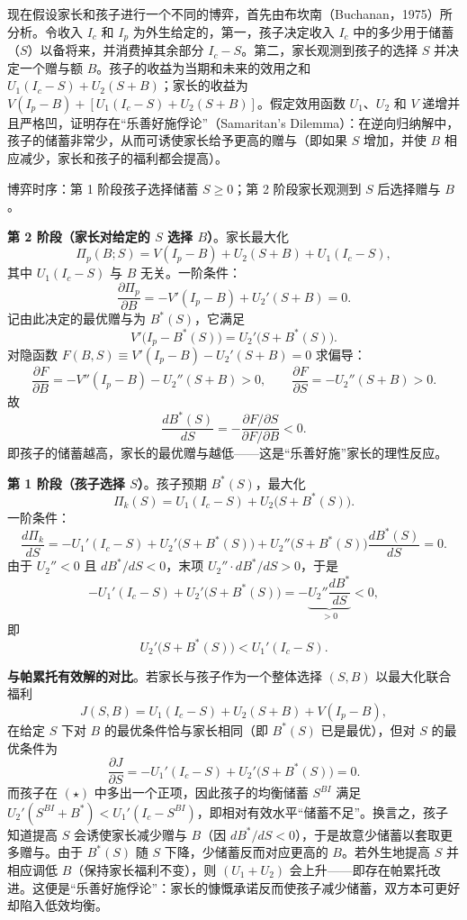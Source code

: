 现在假设家长和孩子进行一个不同的博弈，首先由布坎南（Buchanan，1975）所分析。令收入 $I_c$ 和 $I_p$ 为外生给定的，第一，孩子决定收入 $I_c$ 中的多少用于储蓄（$S$）以备将来，并消费掉其余部分 $I_c-S$。第二，家长观测到孩子的选择 $S$ 并决定一个赠与额 $B$。孩子的收益为当期和未来的效用之和 $U_1(I_c-S)+U_2(S+B)$；家长的收益为 $V(I_p-B)+[U_1(I_c-S)+U_2(S+B)]$。假定效用函数 $U_1$、$U_2$ 和 $V$ 递增并且严格凹，证明存在“乐善好施俘论”（Samaritan's Dilemma）：在逆向归纳解中，孩子的储蓄非常少，从而可诱使家长给予更高的赠与（即如果 $S$ 增加，并使 $B$ 相应减少，家长和孩子的福利都会提高）。

\sol
博弈时序：第 1 阶段孩子选择储蓄 $S\ge 0$；第 2 阶段家长观测到 $S$ 后选择赠与 $B$。

\textbf{第 2 阶段（家长对给定的 $S$ 选择 $B$）}。家长最大化
\[
\Pi_p(B;S)=V(I_p-B)+U_2(S+B)+U_1(I_c-S),
\]\indent
其中 $U_1(I_c-S)$ 与 $B$ 无关。一阶条件：
\[
\frac{\partial\Pi_p}{\partial B}=-V'(I_p-B)+U_2'(S+B)=0.
\]\indent
记由此决定的最优赠与为 $B^*(S)$，它满足
\[
V'\!\bigl(I_p-B^*(S)\bigr)=U_2'\!\bigl(S+B^*(S)\bigr).
\]\indent
对隐函数 $F(B,S)\equiv V'(I_p-B)-U_2'(S+B)=0$ 求偏导：
\[
\frac{\partial F}{\partial B}=-V''(I_p-B)-U_2''(S+B)>0,\qquad
\frac{\partial F}{\partial S}=-U_2''(S+B)>0.
\]\indent
故
\[
\frac{dB^*(S)}{dS}=-\frac{\partial F/\partial S}{\partial F/\partial B}<0.
\]\indent
即孩子的储蓄越高，家长的最优赠与越低——这是“乐善好施”家长的理性反应。

\textbf{第 1 阶段（孩子选择 $S$）}。孩子预期 $B^*(S)$，最大化
\[
\Pi_k(S)=U_1(I_c-S)+U_2\!\bigl(S+B^*(S)\bigr).
\]\indent
一阶条件：
\[
\frac{d\Pi_k}{dS}=-U_1'(I_c-S)+U_2'\!\bigl(S+B^*(S)\bigr)
+U_2''\!\bigl(S+B^*(S)\bigr)\frac{dB^*(S)}{dS}=0.
\]\indent
由于 $U_2''<0$ 且 $dB^*/dS<0$，末项 $U_2''\cdot dB^*/dS>0$，于是
\[
-U_1'(I_c-S)+U_2'\!\bigl(S+B^*(S)\bigr)=-\underbrace{U_2''\frac{dB^*}{dS}}_{>0}<0,
\]\indent
即
\[
U_2'\!\bigl(S+B^*(S)\bigr)<U_1'(I_c-S).\tag{$\star$}
\]

\textbf{与帕累托有效解的对比}。若家长与孩子作为一个整体选择 $(S,B)$ 以最大化联合福利
\[
J(S,B)=U_1(I_c-S)+U_2(S+B)+V(I_p-B),
\]\indent
在给定 $S$ 下对 $B$ 的最优条件恰与家长相同（即 $B^*(S)$ 已是最优），但对 $S$ 的最优条件为
\[
\frac{\partial J}{\partial S}=-U_1'(I_c-S)+U_2'\!\bigl(S+B^*(S)\bigr)=0.
\]\indent
而孩子在 $(\star)$ 中多出一个正项，因此孩子的均衡储蓄 $S^{BI}$ 满足 $U_2'(S^{BI}+B^*)<U_1'(I_c-S^{BI})$，即相对有效水平“储蓄不足”。换言之，孩子知道提高 $S$ 会诱使家长减少赠与 $B$（因 $dB^*/dS<0$），于是故意少储蓄以套取更多赠与。由于 $B^*(S)$ 随 $S$ 下降，少储蓄反而对应更高的 $B$。若外生地提高 $S$ 并相应调低 $B$（保持家长福利不变），则 $(U_1+U_2)$ 会上升——即存在帕累托改进。这便是“乐善好施俘论”：家长的慷慨承诺反而使孩子减少储蓄，双方本可更好却陷入低效均衡。

